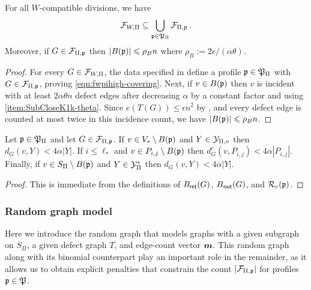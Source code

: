 \begin{lemma}\label{lemma:profile-covering-K1k}
For all $W$-compatible divisions, we have
\begin{equation}\label{eqn:fwpihigh-covering}
{\mathcal F}_{W,\Pi}\subseteq\bigcup_{{\mathfrak p}\in{\mathfrak P}_\Pi}{\mathcal F}_{\Pi,{\mathfrak p}}\,.
\end{equation}
Moreover, if $G\in{\mathcal F}_{\Pi,{\mathfrak p}}$ then $|B({\mathfrak p})|\leqslant \rho_B n$ where $\rho_B:=2\epsilon/(\alpha\theta)$.
\end{lemma}
\begin{proof}
For every $G\in{\mathcal F}_{W,\Pi}$, the data specified in  define a profile ${\mathfrak p}\in{\mathfrak P}_\Pi$ with $G\in{\mathcal F}_{\Pi,{\mathfrak p}}$, proving \eqref{eqn:fwpihigh-covering}. Next, if $v\in B({\mathfrak p})$ then $v$ is incident with at least $2\alpha\theta n$ defect edges after decreasing $\alpha$ by a constant factor and using  \ref{item:SubCloseK1k-theta}. Since $e(T(G))\leq\epsilon n^2$ by , and every defect edge is counted at most twice in this incidence count, we have $|B({\mathfrak p})|\leqslant \rho_Bn$.
\end{proof}

\begin{lemma}\label{lemma:profile-residual-low-rows-K1k}
Let ${\mathfrak p}\in{\mathfrak P}_\Pi$ and let $G\in{\mathcal F}_{\Pi,{\mathfrak p}}$. If $v\in V_\ast\setminus B({\mathfrak p})$ and $Y\in{\mathcal Y}_{\Pi,v}$ then $d_G(v,Y)<4\alpha |Y|$. If $i\leq\ell_\ast$ and $v\in P_{i,j}\setminus B({\mathfrak p})$ then $d_G^c(v,P_{i,j})<4\alpha |P_{i,j}|$. Finally, if $v\in S_\Pi\setminus B({\mathfrak p})$ and $Y\in{\mathcal Y}^\ast_\Pi$ then $d_G(v,Y)<4\alpha |Y|$.
\end{lemma}
\begin{proof}
This is immediate from the definitions of $B_{\mathsf{ret}}(G)$, $B_{\hspace{0.2mm}\mathsf{out}}(G)$, and ${\mathcal R}_v({\mathfrak p})$.
\end{proof}

\subsubsection{Random graph model}
Here we introduce the random graph that models graphs with a given subgraph on $S_\Pi$, a given defect graph $T$, and edge-count vector $\boldsymbol{m}$. This random graph along with its binomial counterpart play an important role in the remainder, as it allows us to obtain explicit penalties that constrain the count $|{\mathcal F}_{\Pi,{\mathfrak p}}|$ for profiles ${\mathfrak p}\in{\mathfrak P}$.

